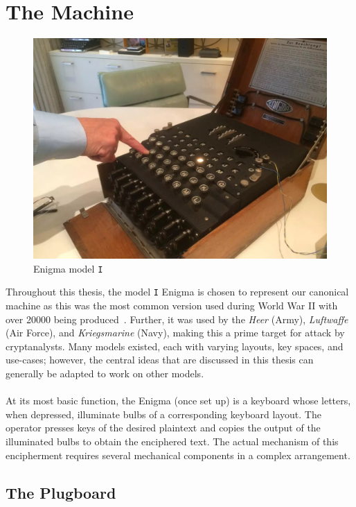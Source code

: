 \section{The Machine}
\begin{figure}[H]
  \begin{center}\includegraphics[scale=0.3]{paper/images/enigma.jpg}
  \end{center}
  \label{ref:enigma}
  \caption{Enigma model \texttt{I}}
\end{figure}
Throughout this thesis, the model \texttt{I} Enigma is chosen to
represent our canonical machine as this was the most common version
used during World War II with over 20000 being produced~\cite{cryptomuseumEnigmaI}. Further, it
was used by the \emph{Heer} (Army), \emph{Luftwaffe} (Air
Force), and \emph{Kriegsmarine} (Navy), making this a prime target
for attack by cryptanalysts. Many models existed,
each with varying
layouts, key spaces, and use-cases; however, the central ideas that
are discussed in this thesis can generally be adapted to work on other models.
\\\\At its most basic function, the Enigma (once set up) is a
keyboard whose letters, when depressed, illuminate bulbs of a
corresponding keyboard layout. The operator presses keys of the
desired plaintext and copies the output of the illuminated bulbs to
obtain the enciphered text. The actual mechanism of this encipherment
requires several mechanical components in a complex arrangement.

\subsection{The Plugboard}


